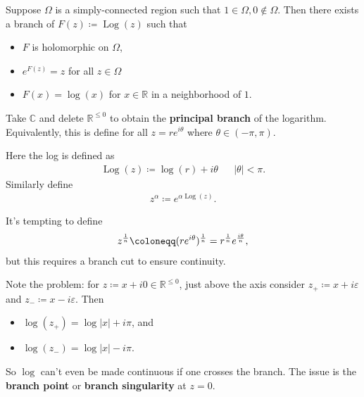 \begin{proposition}

Suppose \(\Omega\) is a simply-connected region such that
\(1\in \Omega, 0\not\in\Omega\). Then there exists a branch of
\(F(z) \coloneqq\operatorname{Log}(z)\) such that

\begin{itemize}
\tightlist
\item
  \(F\) is holomorphic on \(\Omega\),
\item
  \(e^{F(z)} = z\) for all \(z\in \Omega\)
\item
  \(F(x) = \log(x)\) for \(x\in {\mathbb{R}}\) in a neighborhood of
  \(1\).
\end{itemize}

\end{proposition}

\begin{definition}

Take \({\mathbb{C}}\) and delete \({\mathbb{R}}^{\leq 0}\) to obtain the
\textbf{principal branch} of the logarithm. Equivalently, this is define
for all \(z=re^{i\theta}\) where \(\theta \in (-\pi, \pi)\).

Here the log is defined as
\begin{align*}
\operatorname{Log}(z) \coloneqq\log(r) + i\theta && {\left\lvert {\theta} \right\rvert} < \pi
.\end{align*}
Similarly define
\begin{align*}
z^{\alpha} \coloneqq e^{\alpha \operatorname{Log}(z)}
.\end{align*}

\end{definition}

\begin{warnings}

It's tempting to define
\begin{align*}
z^{1\over n} \coloneqq(re^{i\theta})^{1\over n} = r^{1\over n} e^{i\theta \over n}
,\end{align*}
but this requires a branch cut to ensure continuity.

\end{warnings}

\begin{remark}

Note the problem: for \(z\coloneqq x+i0 \in {\mathbb{R}}^{\leq 0}\),
just above the axis consider \(z_+ \coloneqq x + i{\varepsilon}\) and
\(z_- \coloneqq x-i{\varepsilon}\). Then

\begin{itemize}
\tightlist
\item
  \(\log(z_+) = \log{\left\lvert {x} \right\rvert} + i\pi\), and
\item
  \(\log(z_-) = \log{\left\lvert {x} \right\rvert} - i\pi\).
\end{itemize}

So \(\log\) can't even be made continuous if one crosses the branch. The
issue is the \textbf{branch point} or \textbf{branch singularity} at
\(z=0\).

\end{remark}

